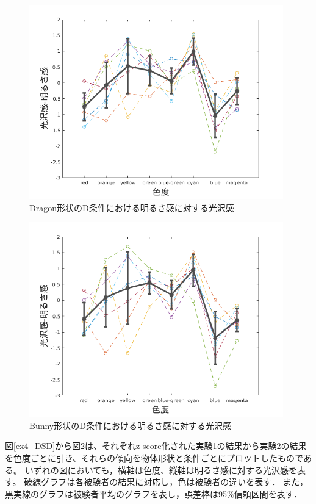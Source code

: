             \newpage
            \begin{figure}[h]
                \centering
                \includegraphics[width=11.0cm]{./img/ex4_DD.png}
                \caption{Dragon形状のD条件における明るさ感に対する光沢感}
                \label{ex4_DD}
            \end{figure}

            \begin{figure}[h]
                \centering
                \includegraphics[width=11.0cm]{./img/ex4_BD.png}
                \caption{Bunny形状のD条件における明るさ感に対する光沢感}
                \label{ex4_BD}
            \end{figure}

            図\ref{ex4_DSD}から図\ref{ex4_BD}は、それぞれz-score化された実験1の結果から実験2の結果を色度ごとに引き、それらの傾向を物体形状と条件ごとにプロットしたものである。
            いずれの図においても，横軸は色度、縦軸は明るさ感に対する光沢感を表す。
            破線グラフは各被験者の結果に対応し，色は被験者の違いを表す．
            また，黒実線のグラフは被験者平均のグラフを表し，誤差棒は95\%信頼区間を表す．
            
